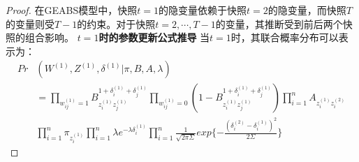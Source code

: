 \begin{proof}
	
	在GEABS模型中，快照$t=1$的隐变量依赖于快照$t=2$的隐变量，而快照$T$的变量则受$T-1$的约束。对于快照$t=2, \cdots, T-1$的变量，其推断受到前后两个快照的组合影响。
	\textbf{$t=1$时的参数更新公式推导}
	当$t=1$时，其联合概率分布可以表示为：
	\begin{equation}
		\begin{split}
			Pr&(W^{(1)},Z^{(1)},\delta^{(1)}|\pi,B,A,\lambda)   \\
			&  = \prod_{w_{ij}^{(1)}=1} B_{z_i^{(1)} z_j^{(1)}}^{1+\delta_i^{(1)}+\delta_j^{(1)}}  \prod_{w_{ij}^{(1)}=0} (1-B_{z_i^{(1)} z_j^{(1)}}^{1+\delta_i^{(1)}+\delta_j^{(1)}})  \prod_{i=1}^{n} A_{z_i^{(1)} z_i^{(2)}}   \\
			&  \prod_{i=1}^{n} \pi_{z_i^{(1)}}  \prod_{i=1}^{n} \lambda e^{-\lambda \delta_i^{(1)}}  \prod_{i=1}^{n} \frac{1}{\sqrt{2\pi \Sigma}} exp\{-\frac{(\delta_i^{(2)}-\delta_i^{(1)})^2}{2\Sigma}\}
		\end{split}
	\end{equation}
	

\end{proof}
